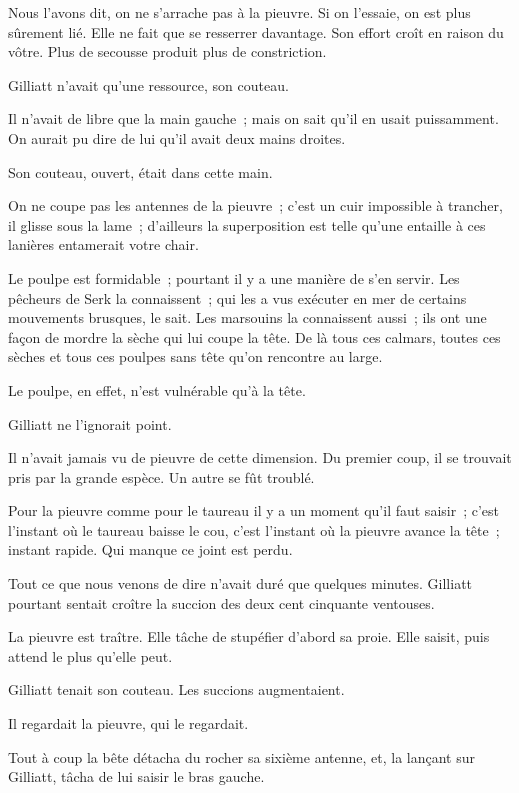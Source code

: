 \documentclass[french,twoside]{book} %
\begin{document}
Nous l’avons dit, on ne s’arrache pas à la pieuvre. Si on l’essaie, on est plus sûrement lié. Elle ne fait que se resserrer davantage. Son effort croît en raison du vôtre. Plus de secousse produit plus de constriction.\par
Gilliatt n’avait qu’une ressource, son couteau.\par
Il n’avait de libre que la main gauche ; mais on sait  qu’il en usait puissamment. On aurait pu dire de lui qu’il avait deux mains droites.\par
Son couteau, ouvert, était dans cette main.\par
On ne coupe pas les antennes de la pieuvre ; c’est un cuir impossible à trancher, il glisse sous la lame ; d’ailleurs la superposition est telle qu’une entaille à ces lanières entamerait votre chair.\par
Le poulpe est formidable ; pourtant il y a une manière de s’en servir. Les pêcheurs de Serk la connaissent ; qui les a vus exécuter en mer de certains mouvements brusques, le sait. Les marsouins la connaissent aussi ; ils ont une façon de mordre la sèche qui lui coupe la tête. De là tous ces calmars, toutes ces sèches et tous ces poulpes sans tête qu’on rencontre au large.\par
Le poulpe, en effet, n’est vulnérable qu’à la tête.\par
Gilliatt ne l’ignorait point.\par
Il n’avait jamais vu de pieuvre de cette dimension. Du premier coup, il se trouvait pris par la grande espèce. Un autre se fût troublé.\par
Pour la pieuvre comme pour le taureau il y a un moment qu’il faut saisir ; c’est l’instant où le taureau baisse le cou, c’est l’instant où la pieuvre avance la tête ; instant rapide. Qui manque ce joint est perdu.\par
Tout ce que nous venons de dire n’avait duré que quelques minutes. Gilliatt pourtant sentait croître la succion des deux cent cinquante ventouses.\par
La pieuvre est traître. Elle tâche de stupéfier d’abord sa proie. Elle saisit, puis attend le plus qu’elle peut.\par
 Gilliatt tenait son couteau. Les succions augmentaient.\par
Il regardait la pieuvre, qui le regardait.\par
Tout à coup la bête détacha du rocher sa sixième antenne, et, la lançant sur Gilliatt, tâcha de lui saisir le bras gauche.\par
\end{document}
